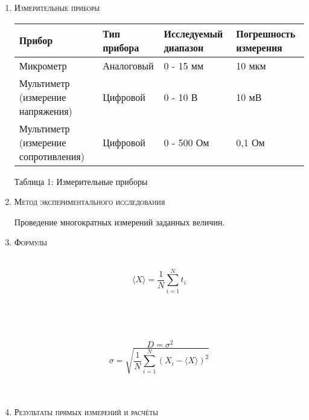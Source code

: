 \documentclass[12pt]{article}
\begin{document}
\begin{enumerate}
    \item \large\textsc{Измерительные приборы}
    \\


     \begin{center}
         
   
      \begin{tabular}{|m{7em}|m{7em}|m{7em}|m{7em}|}
    
       \hline
       Прибор & Тип прибора & Исследуемый диапазон & Погрешность измерения        \\ \hline
       Микрометр & 
       Аналоговый & 0 - 15 мм & 10 мкм\\ \hline
       Мультиметр (измерение напряжения)   & Цифровой & 0 - 10 В & 10 мВ \\ \hline
       Мультиметр (измерение сопротивления)   & Цифровой & 0 - 500 Ом & 0,1 Ом \\ \hline              
      \end{tabular}
     \end{center}   
      \begin{center}
        Таблица 1: Измерительные приборы \\
      \end{center}
    \item \large\textsc{Метод экспериментального исследования}

    Проведение многократных измерений заданных величин.
    

    \item \large\textsc{Формулы}

\\
\begin{equation}
    \langle X \rangle = \frac{1}{N} \sum_{i=1}^{N} t_i
\end{equation}
\\

\\
\\
\\
\begin{equation}
    \ D=\sigma^2 
\end{equation}
\begin{equation}
        \sigma = \sqrt{\frac{1}{N} \sum_{i=1}^{N} (X_i-\langle X \rangle)^2}
\end{equation}
\\
\\
    \item \large\textsc{Результаты прямых  измерений и расчёты}
    

\end{enumerate}
\end{document}

